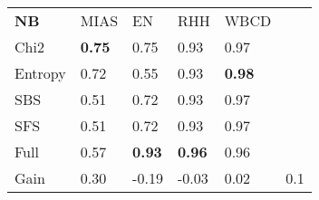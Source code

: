 \begin{tabular}{|l|l|l|l|l|l}
\cline{1-5}
        \textbf{NB} & MIAS              & EN                & RHH               & WBCD      &         \\
\cline{1-5}
Chi2    & \textbf{0.75} &  0.75 &  0.93 & 0.97 \\
Entropy & 0.72 &  0.55 &  0.93 & \textbf{0.98} \\
SBS     & 0.51 &  0.72 &  0.93 & 0.97 \\
SFS     & 0.51 &  0.72 &  0.93 & 0.97 \\
Full    & 0.57 &  \textbf{0.93} &  \textbf{0.96} & 0.96 \\
\cline{1-5}
Gain    & 0.30 & -0.19 & -0.03 & 0.02 & 0.1\\
\cline{1-5}
\end{tabular}
